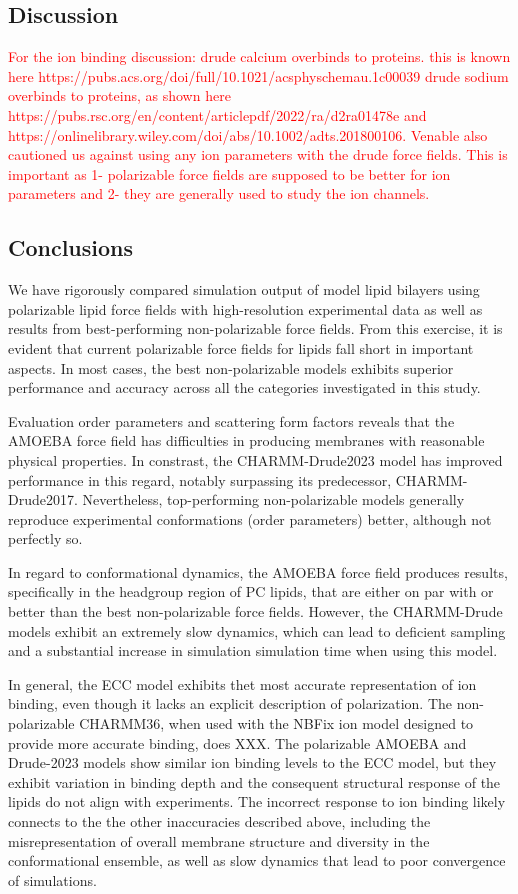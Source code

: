 \documentclass[journal=jacsat,manuscript=article,layout=singlecolumn]{achemso}
\begin{document}
\subsection{Discussion}

\textcolor{red}{For the ion binding discussion: drude calcium overbinds to proteins. this is known here https://pubs.acs.org/doi/full/10.1021/acsphyschemau.1c00039
drude sodium overbinds to proteins, as shown here https://pubs.rsc.org/en/content/articlepdf/2022/ra/d2ra01478e and https://onlinelibrary.wiley.com/doi/abs/10.1002/adts.201800106. Venable also cautioned us against using any ion parameters with the drude force fields. This is important as 1- polarizable force fields are supposed to be better for ion parameters and 2- they are generally used to study the ion channels.}

\subsection{Conclusions}
We have rigorously compared simulation output of model lipid bilayers using polarizable lipid force fields with high-resolution experimental data as well as results from best-performing non-polarizable force fields. From this exercise, it is evident that current polarizable force fields for lipids fall short in important aspects. In most cases, the best non-polarizable models exhibits superior performance and accuracy across all the categories investigated in this study.

Evaluation order parameters and scattering form factors reveals that the AMOEBA force field has difficulties in producing membranes with reasonable physical properties. In constrast, the CHARMM-Drude2023 model has improved performance in this regard, notably surpassing its predecessor, CHARMM-Drude2017. Nevertheless, top-performing non-polarizable models generally reproduce experimental conformations (order parameters) better, although not perfectly so.

In regard to conformational dynamics, the AMOEBA force field produces results, specifically in the headgroup region of PC lipids, that are either on par with or better than the best non-polarizable force fields. However, the CHARMM-Drude models exhibit an extremely slow dynamics, which can lead to deficient sampling and a substantial increase in simulation simulation time when using this model.


In general, the ECC model exhibits thet most accurate representation of ion binding, even though it lacks an explicit description of polarization. The non-polarizable CHARMM36, when used with the NBFix ion model designed to provide more accurate binding, does XXX. The polarizable AMOEBA and Drude-2023 models show similar ion binding levels to the ECC model, but they exhibit variation in binding depth and the consequent structural response of the lipids do not align with experiments. The incorrect response to ion binding likely connects to the the other inaccuracies described above, including the misrepresentation of overall membrane structure and diversity in the conformational ensemble, as well as slow dynamics that lead to poor convergence of simulations. 
\end{document}
